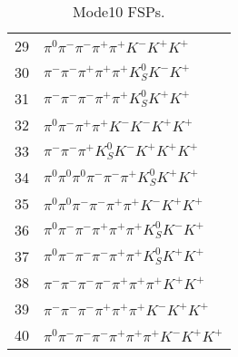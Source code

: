 \begin{table}[h!]
\begin{center}
\begin{tabular}{cl}
29 & $\pi^0 \pi^- \pi^- \pi^+ \pi^+ K^- K^+ K^+ $ \\
30 & $\pi^- \pi^- \pi^+ \pi^+ \pi^+ K_S^0 K^- K^+ $ \\
31 & $\pi^- \pi^- \pi^- \pi^+ \pi^+ K_S^0 K^+ K^+ $ \\
32 & $\pi^0 \pi^- \pi^+ \pi^+ K^- K^- K^+ K^+ $ \\
33 & $\pi^- \pi^- \pi^+ K_S^0 K^- K^+ K^+ K^+ $ \\
34 & $\pi^0 \pi^0 \pi^0 \pi^- \pi^- \pi^+ K_S^0 K^+ K^+ $ \\
35 & $\pi^0 \pi^0 \pi^- \pi^- \pi^+ \pi^+ K^- K^+ K^+ $ \\
36 & $\pi^0 \pi^- \pi^- \pi^+ \pi^+ \pi^+ K_S^0 K^- K^+ $ \\
37 & $\pi^0 \pi^- \pi^- \pi^- \pi^+ \pi^+ K_S^0 K^+ K^+ $ \\
38 & $\pi^- \pi^- \pi^- \pi^- \pi^+ \pi^+ \pi^+ K^+ K^+ $ \\
39 & $\pi^- \pi^- \pi^- \pi^+ \pi^+ \pi^+ K^- K^+ K^+ $ \\
40 & $\pi^0 \pi^- \pi^- \pi^- \pi^+ \pi^+ \pi^+ K^- K^+ K^+ $ \\
\hline
\end{tabular}
\label{tab:Mode10FSPs}
\caption{Mode10 FSPs.}
\end{center}
\end{table}
